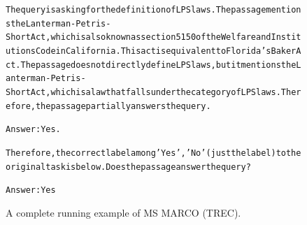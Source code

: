 \begin{figure}[t]
{{\begin{alltt}
The query is asking for the definition of LPS laws. The passage mentions the Lanterman-Petris-Short Act, which is also known as section 5150 of the Welfare and Institutions Code in California. This act is equivalent to Florida's Baker Act. The passage does not directly define LPS laws, but it mentions the Lanterman-Petris-Short Act, which is a law that falls under the category of LPS laws. Therefore, the passage partially answers the query. 

Answer: Yes. 

Therefore, the correct label among {'Yes', 'No'} (just the label) to the original task is below. Does the passage answer the query? 

Answer: Yes
\end{alltt}
}}
\caption{A complete running example of MS MARCO (TREC).}
\label{fig:msmarco=trec_example}
\end{figure}